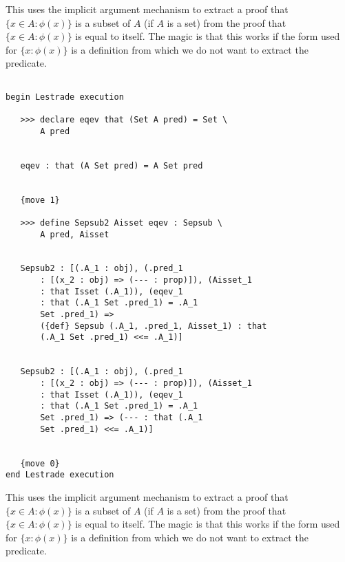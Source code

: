 \documentclass[12pt]{article}
\begin{document}
This uses the implicit argument mechanism to extract a proof that $\{x \in A:\phi(x)\}$ is a subset of $A$ (if $A$ is a set) from the proof that $\{x \in A:\phi(x)\}$ is equal to itself.
The magic is that this works if the form used for $\{x : \phi(x)\}$ is a definition from which we do not want to extract the predicate.

\begin{verbatim}

begin Lestrade execution

   >>> declare eqev that (Set A pred) = Set \
       A pred


   eqev : that (A Set pred) = A Set pred


   {move 1}

   >>> define Sepsub2 Aisset eqev : Sepsub \
       A pred, Aisset


   Sepsub2 : [(.A_1 : obj), (.pred_1 
       : [(x_2 : obj) => (--- : prop)]), (Aisset_1 
       : that Isset (.A_1)), (eqev_1 
       : that (.A_1 Set .pred_1) = .A_1 
       Set .pred_1) => 
       ({def} Sepsub (.A_1, .pred_1, Aisset_1) : that 
       (.A_1 Set .pred_1) <<= .A_1)]


   Sepsub2 : [(.A_1 : obj), (.pred_1 
       : [(x_2 : obj) => (--- : prop)]), (Aisset_1 
       : that Isset (.A_1)), (eqev_1 
       : that (.A_1 Set .pred_1) = .A_1 
       Set .pred_1) => (--- : that (.A_1 
       Set .pred_1) <<= .A_1)]


   {move 0}
end Lestrade execution
\end{verbatim}

This uses the implicit argument mechanism to extract a proof that $\{x \in A:\phi(x)\}$ is a subset of $A$ (if $A$ is a set) from the proof that $\{x \in A:\phi(x)\}$ is equal to itself.
The magic is that this works if the form used for $\{x : \phi(x)\}$ is a definition from which we do not want to extract the predicate.
\end{document}

